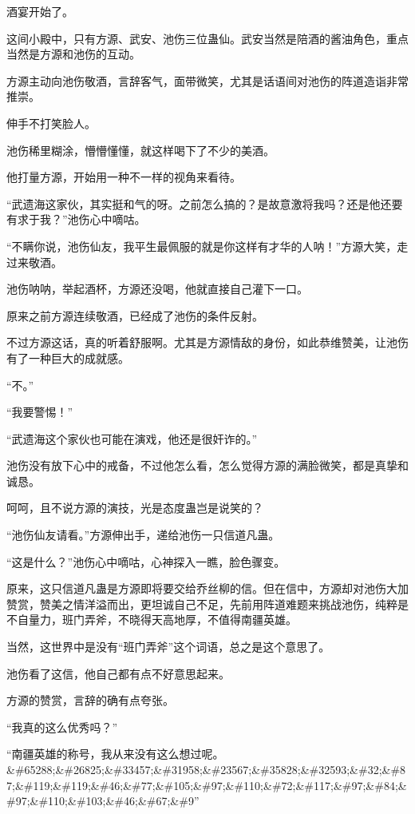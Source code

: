 
\begin{this_body}

酒宴开始了。

这间小殿中，只有方源、武安、池伤三位蛊仙。武安当然是陪酒的酱油角色，重点当然是方源和池伤的互动。

方源主动向池伤敬酒，言辞客气，面带微笑，尤其是话语间对池伤的阵道造诣非常推崇。

伸手不打笑脸人。

池伤稀里糊涂，懵懵懂懂，就这样喝下了不少的美酒。

他打量方源，开始用一种不一样的视角来看待。

“武遗海这家伙，其实挺和气的呀。之前怎么搞的？是故意激将我吗？还是他还要有求于我？”池伤心中嘀咕。

“不瞒你说，池伤仙友，我平生最佩服的就是你这样有才华的人呐！”方源大笑，走过来敬酒。

池伤呐呐，举起酒杯，方源还没喝，他就直接自己灌下一口。

原来之前方源连续敬酒，已经成了池伤的条件反射。

不过方源这话，真的听着舒服啊。尤其是方源情敌的身份，如此恭维赞美，让池伤有了一种巨大的成就感。

“不。”

“我要警惕！”

“武遗海这个家伙也可能在演戏，他还是很奸诈的。”

池伤没有放下心中的戒备，不过他怎么看，怎么觉得方源的满脸微笑，都是真挚和诚恳。

呵呵，且不说方源的演技，光是态度蛊岂是说笑的？

“池伤仙友请看。”方源伸出手，递给池伤一只信道凡蛊。

“这是什么？”池伤心中嘀咕，心神探入一瞧，脸色骤变。

原来，这只信道凡蛊是方源即将要交给乔丝柳的信。但在信中，方源却对池伤大加赞赏，赞美之情洋溢而出，更坦诚自己不足，先前用阵道难题来挑战池伤，纯粹是不自量力，班门弄斧，不晓得天高地厚，不值得南疆英雄。

当然，这世界中是没有“班门弄斧”这个词语，总之是这个意思了。

池伤看了这信，他自己都有点不好意思起来。

方源的赞赏，言辞的确有点夸张。

“我真的这么优秀吗？”

“南疆英雄的称号，我从来没有这么想过呢。\&\#65288;\&\#26825;\&\#33457;\&\#31958;\&\#23567;\&\#35828;\&\#32593;\&\#32;\&\#87;\&\#119;\&\#119;\&\#46;\&\#77;\&\#105;\&\#97;\&\#110;\&\#72;\&\#117;\&\#97;\&\#84;\&\#97;\&\#110;\&\#103;\&\#46;\&\#67;\&\#9”


\end{this_body}
